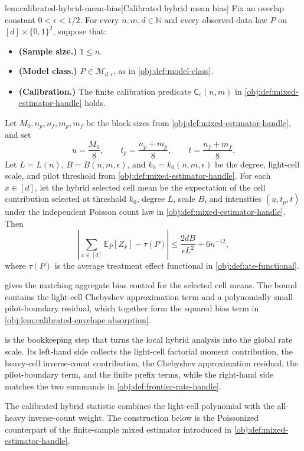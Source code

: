 \begin{lemmav}{lem:calibrated-hybrid-mean-bias}[Calibrated hybrid mean bias]
Fix an overlap constant \(0<\epsilon<1/2\).  For every \(n,m,d\in\mathbb N\) and every observed-data law \(P\) on \([d]\times\{0,1\}^2\), suppose that:
\begin{itemize}
\item \textbf{(Sample size.)} \(1\le n\).
\item \textbf{(Model class.)} \(P\in\mathcal M_{d,\epsilon}\), as in \cref{obj:def:model-class}.
\item \textbf{(Calibration.)} The finite calibration predicate \(\mathsf C_\epsilon(n,m)\) in \cref{obj:def:mixed-estimator-handle} holds.
\end{itemize}
Let \(M_0,n_p,n_f,m_p,m_f\) be the block sizes from \cref{obj:def:mixed-estimator-handle}, and set
\[
u=\frac{M_0}{8},\qquad
t_p=\frac{n_p+m_p}{8},\qquad
t=\frac{n_f+m_f}{8}.
\]
Let \(L=L(n)\), \(B=B(n,m,\epsilon)\), and \(k_0=k_0(n,m,\epsilon)\) be the degree, light-cell scale, and pilot threshold from \cref{obj:def:mixed-estimator-handle}.  For each \(x\in[d]\), let the hybrid selected cell mean be the expectation of the cell contribution selected at threshold \(k_0\), degree \(L\), scale \(B\), and intensities \((u,t_p,t)\) under the independent Poisson count law in \cref{obj:def:mixed-estimator-handle}.  Then
\[
\left|
\sum_{x\in[d]}
\mathbb E_P[Z_x]
-\tau(P)
\right|
\le
\frac{2dB}{\epsilon L^2}+6n^{-12},
\]
where \(\tau(P)\) is the average treatment effect functional in \cref{obj:def:ate-functional}.
\end{lemmav}

 gives the matching aggregate bias control for the selected cell means. The bound contains the light-cell Chebyshev approximation term and a polynomially small pilot-boundary residual, which together form the squared bias term in \cref{obj:lem:calibrated-envelope-absorption}.

 is the bookkeeping step that turns the local hybrid analysis into the global rate scale. Its left-hand side collects the light-cell factorial moment contribution, the heavy-cell inverse-count contribution, the Chebyshev approximation residual, the pilot-boundary term, and the finite prefix terms, while the right-hand side matches the two summands in \cref{obj:def:frontier-rate-handle}.

The calibrated hybrid statistic combines the light-cell polynomial with the all-heavy inverse-count weight. The construction below is the Poissonized counterpart of the finite-sample mixed estimator introduced in \cref{obj:def:mixed-estimator-handle}.

